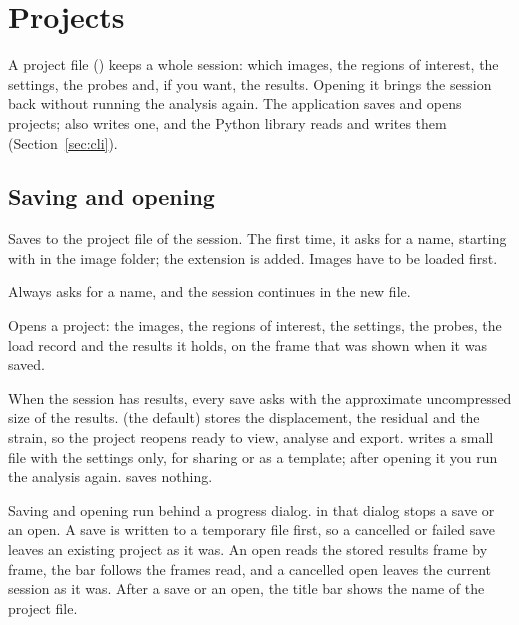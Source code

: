 \section{Projects}
\label{sec:projects}

A project file () keeps a whole session: which images, the regions of interest, the
settings, the probes and, if you want, the results. Opening it brings the session back without
running the analysis again. The application saves and opens projects;  also writes one, and the Python library reads and writes them
(Section~\ref{sec:cli}).

\subsection{Saving and opening}

\begin{description}[leftmargin=0.6cm,style=nextline]
  \item[\menu{File}{Save Project} (\kbd{Ctrl+S})]
    Saves to the project file of the session. The first time, it asks for a name, starting with
     in the image folder; the extension  is added. Images
    have to be loaded first.
  \item[\menu{File}{Save Project As…} (\kbd{Ctrl+Shift+S})]
    Always asks for a name, and the session continues in the new file.
  \item[\menu{File}{Open Project…} (\kbd{Ctrl+O})]
    Opens a project: the images, the regions of interest, the settings, the probes, the load
    record and the results it holds, on the frame that was shown when it was saved.
\end{description}

When the session has results, every save asks 
with the approximate uncompressed size of the results.  (the default) stores the
displacement, the residual and the strain, so the project reopens ready to view, analyse and
export.  writes a small file with the settings only, for sharing or as a template; after
opening it you run the analysis again.  saves nothing.

Saving and opening run behind a progress dialog.  in that dialog stops a save or an
open. A save is written to a temporary file first, so a cancelled or failed save leaves an
existing project as it was. An open reads the stored results frame by frame, the bar follows the
frames read, and a cancelled open leaves the current session as it was. After a save or an open, the title bar shows the name of the project file.

